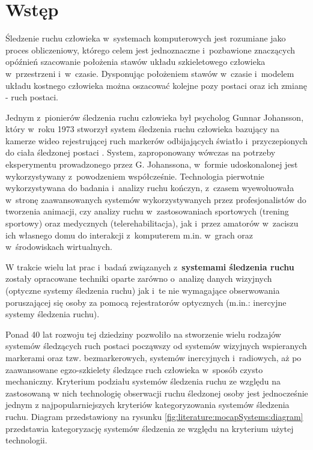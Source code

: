 
\chapter{Wstęp}\label{chap:intro}
Śledzenie ruchu człowieka w~systemach komputerowych jest rozumiane jako proces obliczeniowy, którego celem jest jednoznaczne i~pozbawione znaczących opóźnień szacowanie położenia stawów układu szkieletowego człowieka w~przestrzeni i~w~czasie. Dysponując położeniem stawów w~czasie i~modelem układu kostnego człowieka można oszacować kolejne pozy postaci oraz ich zmianę - ruch postaci.

Jednym z~pionierów śledzenia ruchu człowieka był psycholog Gunnar Johansson, który w~roku 1973 stworzył system śledzenia ruchu człowieka bazujący na kamerze wideo rejestrującej ruch markerów odbijających światło i~przyczepionych do ciała śledzonej postaci \cite{Johansson1973}. System, zaproponowany wówczas na potrzeby eksperymentu prowadzonego przez G. Johanssona, w~formie udoskonalonej jest wykorzystywany z~powodzeniem współcześnie. Technologia pierwotnie wykorzystywana do badania i~analizy ruchu kończyn, z~czasem wyewoluowała w~stronę zaawansowanych systemów wykorzystywanych przez profesjonalistów do tworzenia animacji, czy analizy ruchu w~zastosowaniach sportowych (trening sportowy) oraz medycznych (telerehabilitacja), jak i~przez amatorów w~zaciszu ich własnego domu do interakcji z~komputerem m.in. w~grach oraz w~środowiskach wirtualnych.

W trakcie wielu lat prac i~badań związanych z~\textbf{systemami śledzenia ruchu} zostały opracowane techniki oparte zarówno o~analizę danych wizyjnych (optyczne systemy śledzenia ruchu) jak i~te nie wymagające obserwowania poruszającej się osoby za pomocą rejestratorów optycznych (m.in.: inercyjne systemy śledzenia ruchu).

Ponad 40 lat rozwoju tej dziedziny pozwoliło na stworzenie wielu rodzajów systemów śledzących ruch postaci począwszy od systemów wizyjnych wspieranych markerami oraz tzw. bezmarkerowych, systemów inercyjnych i~radiowych, aż po zaawansowane egzo-szkielety śledzące ruch człowieka w~sposób czysto mechaniczny. Kryterium podziału systemów śledzenia ruchu ze względu na zastosowaną w nich technologię obserwacji ruchu śledzonej osoby jest jednocześnie jednym z najpopularniejszych kryteriów kategoryzowania systemów śledzenia ruchu. Diagram przedstawiony na rysunku \ref{fig:literature:mocapSystems:diagram} przedstawia kategoryzację systemów śledzenia ze względu na kryterium użytej technologii.

